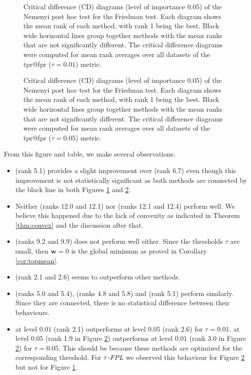 \begin{figure}[!ht]
    \centering
    
    \caption{Critical difference (CD) diagrams (level of importance 0.05) of the Nemenyi post hoc test for the Friedman test. Each diagram shows the mean rank of each method, with rank 1 being the best. Black wide horizontal lines group together methods with the mean ranks that are not significantly different. The critical difference diagrams were computed for mean rank averages over all datasets of the tpr@fpr ($\tau=0.01$) metric.}
    \label{fig:cd1}
\end{figure}

\begin{figure}[!ht]
    \centering
    
    \caption{Critical difference (CD) diagrams (level of importance 0.05) of the Nemenyi post hoc test for the Friedman test. Each diagram shows the mean rank of each method, with rank 1 being the best. Black wide horizontal lines group together methods with the mean ranks that are not significantly different. The critical difference diagrams were computed for mean rank averages over all datasets of the tpr@fpr ($\tau=0.05$) metric.}
    \label{fig:cd2}
\end{figure}

From this figure and table, we make several observations:
\begin{itemize}
  \item \TopPushK (rank 5.1) provides a slight improvement over \TopPush (rank 6.7) even though this improvement is not statistically significant as both methods are connected by the black line in both Figures \ref{fig:cd1} and \ref{fig:cd2}.
  \item Neither \Grill (ranks 12.0 and 12.1) nor \GrillNP (ranks 12.1 and 12.4) perform well. We believe this happened due to the lack of convexity as indicated in Theorem \ref{thm:convex} and the discussion after that.
  \item \TopMeanK (ranks 9.2 and 9.9) does not perform well either. Since the thresholds $\tau$ are small, then $\bm{w}=0$ is the global minimum as proved in Corollary \ref{cor:topmean}.
  \item \PatMatNP (rank 2.1 and 2.6) seems to outperform other methods.
  \item \PatMat (ranks 5.0 and 5.4), \tauFPL (ranks 4.8 and 5.8) and \TopPushK (rank 5.1) perform similarly. Since they are connected, there is no statistical difference between their behaviours.
  \item \PatMatNP at level $0.01$ (rank 2.1) outperforms \PatMatNP at level $0.05$ (rank 2.6) for $\tau=0.01$. \PatMatNP at level $0.05$ (rank 1.9 in Figure \ref{fig:cd2}) outperforms \PatMatNP at level $0.01$ (rank 3.0 in Figure \ref{fig:cd2}) for $\tau=0.05$. This should be because these methods are optimized for the corresponding threshold. For ${\emph{$\tau$-FPL}}$ we observed this behaviour for Figure \ref{fig:cd2} but not for Figure \ref{fig:cd1}.
\end{itemize}

